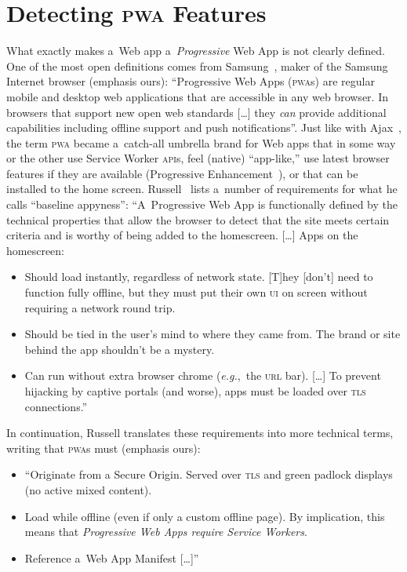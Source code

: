 \documentclass[sigconf,hyphens]{acmart}
\begin{document}
\section{Detecting \textsc{pwa} Features}
\label{sec:pwa-feature-detector}

What exactly makes a~Web app a~\emph{Progressive} Web App is not clearly defined.
One of the most open definitions comes from Samsung~\cite{samsung2017pwa},
maker of the Samsung Internet browser (emphasis ours):
``Progressive Web Apps (\textsc{pwa}s) are regular mobile and desktop web applications
that are accessible in any web browser.
In browsers that support new open web standards [\ldots]
they \emph{can} provide additional capabilities
including offline support and push notifications''.
Just like with Ajax~\cite{garret2005ajax}, the term \textsc{pwa}
became a~catch-all umbrella brand for Web apps
that in some way or the other use Service Worker \textsc{api}s,
feel (native) ``app-like,'' use latest browser features if they are available
(Progressive Enhancement~\cite{champeon2003progressiveenhancement}),
or that can be installed to the home screen.
Russell~\cite{russell2016pwa} lists a~number of requirements 
for what he calls ``baseline appyness'':
``A~Progressive Web App is functionally defined by the technical properties
that allow the browser to detect that the site meets certain criteria
and is worthy of being added to the homescreen.
[\ldots]
Apps on the homescreen:

\begin{itemize}
  \item Should load instantly, regardless of network state.
    [T]hey [don't] need to function fully offline,
    but they must put their own \textsc{ui} on screen without requiring a network round trip.
  \item Should be tied in the user's mind to where they came from.
    The brand or site behind the app shouldn't be a mystery.
  \item Can run without extra browser chrome (\emph{e.g.},\ the \textsc{url} bar).
    [\ldots] To prevent hijacking by captive portals (and worse),
    apps must be loaded over \textsc{tls} connections.''
\end{itemize}

In continuation, Russell translates these requirements into more technical terms,
writing that \textsc{pwa}s must (emphasis ours):

\begin{itemize}
  \item ``Originate from a Secure Origin.
    Served over \textsc{tls} and green padlock displays (no active mixed content).
  \item Load while offline (even if only a custom offline page).
    By implication, this means that \emph{Progressive Web Apps require Service Workers}.
  \item Reference a~Web App Manifest [\ldots]''
\end{itemize}
\end{document}

